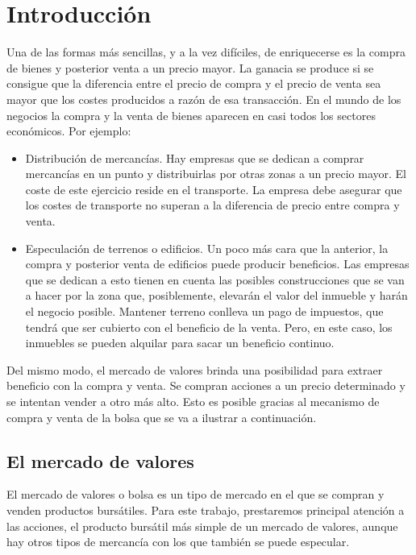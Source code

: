 \section{Introducci\'on}

Una de las formas más sencillas, y a la vez dif\'iciles, de enriquecerse es la compra de bienes y posterior venta a un precio mayor. La ganacia se produce si se consigue que la diferencia entre el precio de compra y el precio de venta sea mayor que los costes producidos a raz\'on de esa transacci\'on. En el mundo de los negocios la compra y la venta de bienes aparecen en casi todos los sectores econ\'omicos. Por ejemplo:

\begin{itemize}
    \item Distribuci\'on de mercanc\'ias. Hay empresas que se dedican a comprar mercanc\'ias en un punto y distribuirlas por otras zonas a un precio mayor. El coste de este ejercicio reside en el transporte. La empresa debe asegurar que los costes de transporte no superan a la diferencia de precio entre compra y venta.
    
    \item Especulaci\'on de terrenos o edificios. Un poco m\'as cara que la anterior, la compra y posterior venta de edificios puede producir beneficios. Las empresas que se dedican a esto tienen en cuenta las posibles construcciones que se van a hacer por la zona que, posiblemente, elevar\'an el valor del inmueble y har\'an el negocio posible. Mantener terreno conlleva un pago de impuestos, que tendr\'a que ser cubierto con el beneficio de la venta. Pero, en este caso, los inmuebles se pueden alquilar para sacar un beneficio continuo.
\end{itemize}

Del mismo modo, el mercado de valores brinda una posibilidad para extraer beneficio con la compra y venta. Se compran acciones a un precio determinado y se intentan vender a otro m\'as alto. Esto es posible gracias al mecanismo de compra y venta de la bolsa que se va a ilustrar a continuaci\'on.

\subsection{El mercado de valores}

El mercado de valores o bolsa es un tipo de mercado en el que se compran y venden productos burs\'atiles. Para este trabajo, prestaremos principal atenci\'on a las acciones, el producto burs\'atil m\'as simple de un mercado de valores, aunque hay otros tipos de mercanc\'ia con los que tambi\'en se puede especular.\\

